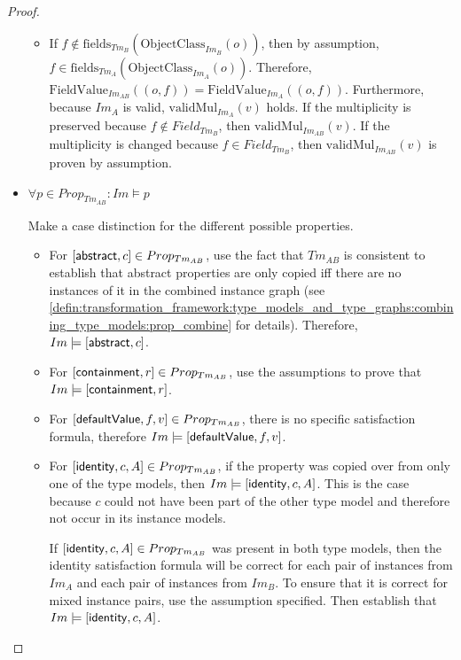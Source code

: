 \begin{proof}
\begin{itemize}
\begin{itemize}
        \item If $f \not\in \mathrm{fields}_{Tm_{B}}(\mathrm{ObjectClass}_{Im_{B}}(o))$, then by assumption, $f \in \mathrm{fields}_{Tm_{A}}(\mathrm{ObjectClass}_{Im_{A}}(o))$. Therefore, $\mathrm{FieldValue}_{Im_{AB}}(( o, f )) = \mathrm{FieldValue}_{Im_{A}}(( o, f ))$. Furthermore, because $Im_{A}$ is valid, $\mathrm{validMul}_{Im_{A}}(v)$ holds. If the multiplicity is preserved because $f \not\in Field_{Tm_B}$, then $\mathrm{validMul}_{Im_{AB}}(v)$. If the multiplicity is changed because $f \in Field_{Tm_B}$, then $\mathrm{validMul}_{Im_{AB}}(v)$ is proven by assumption.
    \end{itemize}
    
    
    \item $\forall p \in Prop_{Tm_{AB}}\!: Im \models p$
    
    Make a case distinction for the different possible properties.
    \begin{itemize}
        \item For $[ \mathsf{abstract}, c ] \in Prop_{Tm_{AB}}$, use the fact that $Tm_{AB}$ is consistent to establish that abstract properties are only copied iff there are no instances of it in the combined instance graph (see \cref{defin:transformation_framework:type_models_and_type_graphs:combining_type_models:prop_combine} for details). Therefore, $Im \models [ \mathsf{abstract}, c ]$.
        
        \item For $[ \mathsf{containment}, r ] \in Prop_{Tm_{AB}}$, use the assumptions to prove that $Im \models [ \mathsf{containment}, r ]$.
        
        \item For $[ \mathsf{defaultValue}, f, v ] \in Prop_{Tm_{AB}}$, there is no specific satisfaction formula, therefore $Im \models [ \mathsf{defaultValue}, f, v ]$.
        
        \item For $[ \mathsf{identity}, c, A ] \in Prop_{Tm_{AB}}$, if the property was copied over from only one of the type models, then $Im \models [ \mathsf{identity}, c, A ]$. This is the case because $c$ could not have been part of the other type model and therefore not occur in its instance models.
        
        If $[ \mathsf{identity}, c, A ] \in Prop_{Tm_{AB}}$ was present in both type models, then the identity satisfaction formula will be correct for each pair of instances from $Im_{A}$ and each pair of instances from $Im_{B}$. To ensure that it is correct for mixed instance pairs, use the assumption specified. Then establish that $Im \models [ \mathsf{identity}, c, A ]$.
        

\end{itemize}
\end{itemize}
\end{proof}
